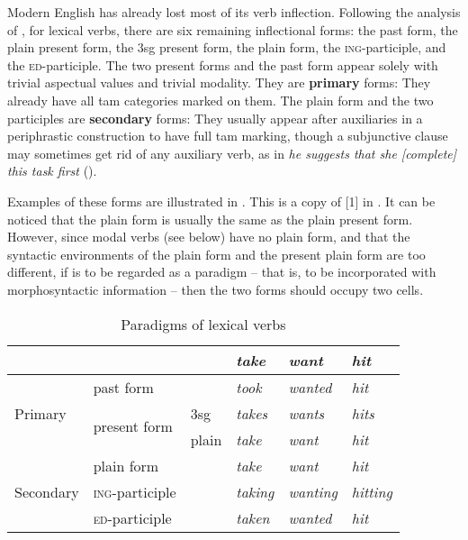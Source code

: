 \documentclass[UTF8, a4paper, oneside, scheme=plain]{ctexrep}
\newcommand*{\citesec}[1]{\S~{#1}}
\newcommand*{\citechap}[1]{Ch~{#1}}
\newcommand*{\citechapsec}[2]{\citechap{#1}.\citesec{#2}}
\newcommand*{\concept}[1]{\textbf{#1}}
\newcommand{\corpus}[1]{\emph{#1}}
\newcommand{\corpuscat}[1]{\textsc{#1}}
\begin{document}
Modern English has already lost most of its verb inflection.
Following the analysis of \citet[\citechapsec{3}{1.1}]{cgel},
for lexical verbs,
there are six remaining inflectional forms: 
the past form, the plain present form, 
the 3sg present form,
the plain form, the \corpuscat{ing}-participle,
and the \corpuscat{ed}-participle.
The two present forms and the past form appear solely 
with trivial aspectual values and trivial modality.
They are \concept{primary} forms:
They already have all \acs{tam} categories marked on them.
The plain form and the two participles are \concept{secondary} forms:
They usually appear after auxiliaries 
in a periphrastic construction to have full \acs{tam} marking,
though a subjunctive clause may sometimes get rid of any auxiliary verb,
as in \corpus{he suggests that she [complete] this task first} ().

Examples of these forms are illustrated in . 
This is a copy of [1] in \citet[\citesec{1.1}]{cgel}.
It can be noticed that the plain form is usually the same as the plain present form.
However, since modal verbs (see below) have no plain form,
and that the syntactic environments of the plain form and the present plain form are too different,
if  is to be regarded as a paradigm
-- that is, to be incorporated with morphosyntactic information -- 
then the two forms should occupy two cells.

\begin{table}[H]
    \caption{Paradigms of lexical verbs}
    \label{tbl:lexical-inflection}
    \centering
    \begin{tabular}{@{}llllll@{}}
    \toprule
    \multicolumn{1}{l}{}       &                               &       & \corpus{take}   & \corpus{want}    & \corpus{hit}     \\ \midrule
    \multirow{3}{*}{Primary}   & past form                     &       & \corpus{took}   & \corpus{wanted}  & \corpus{hit}     \\
                               & \multirow{2}{*}{present form} & 3sg   & \corpus{takes}  & \corpus{wants}   & \corpus{hits}    \\
                               &                               & plain & \corpus{take}   & \corpus{want}    & \corpus{hit}     \\ \midrule
    \multirow{3}{*}{Secondary} & plain form                    &       & \corpus{take}   & \corpus{want}    & \corpus{hit}     \\
                               & \corpuscat{ing}-participle       &       & \corpus{taking} & \corpus{wanting} & \corpus{hitting} \\
                               & \corpuscat{ed}-participle        &       & \corpus{taken}  & \corpus{wanted}  & \corpus{hit}     \\ \bottomrule
    \end{tabular}
\end{table}
\end{document}
